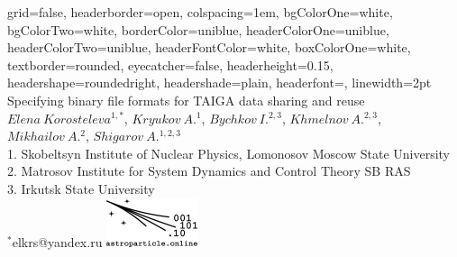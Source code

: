 \documentclass[a0paper,portrait]{baposter}
\begin{document}


\begin{poster}
{
grid=false,
headerborder=open, %
colspacing=1em, %
bgColorOne=white, %
bgColorTwo=white, %
borderColor=uniblue, %
headerColorOne=uniblue, %
headerColorTwo=uniblue, %
headerFontColor=white, %
boxColorOne=white, %
textborder=rounded, %
eyecatcher=false, %
headerheight=0.15\textheight, %
headershape=roundedright, %
headershade=plain,
headerfont=\Large\textsf, %
linewidth=2pt %
}
{}
%
%
{
\textsf %
{Specifying binary file formats for TAIGA data sharing and reuse
}
} 
{\sf\vspace{0em}\\
$Elena~Korosteleva^{1,*}$, $Kryukov~A.^{1}$, $Bychkov~I.^{2,3}$, $Khmelnov~A.^{2,3}$, $Mikhailov~A.^{2}$, $Shigarov~A.^{1,2,3}$
\vspace{0.1em}\\
\small{1. Skobeltsyn Institute of Nuclear Physics, Lomonosov Moscow State University\\
2. Matrosov Institute for System Dynamics and Control Theory SB RAS\\
3. Irkutsk State University
\vspace{0.0em}\\
$^*$elkrs@yandex.ru}
}
{\includegraphics[width=0.20\textwidth]{logo_var1.pdf}
}
 


\end{poster}
\end{document}
